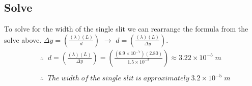 \documentclass{article}
\begin{document}
\subsection*{Solve}
To solve for the width of the single slit we can rearrange the formula from the solve above. $\Delta y = \left(\frac{(\lambda)(L)}{d}\right)$ $\to$ $d = \left(\frac{(\lambda)(L)}{\Delta y}\right)$.\\
\begin{align*}
     & \therefore\;\;d = \left(\frac{(\lambda)(L)}{\Delta y}\right) = \left(\frac{(6.9 \times 10^{-7})(2.80)}{1.5 \times 10^{-2}}\right) \approx 3.22 \times 10^{-5}\;m \\\\
     & \therefore\;\;The\;width \;of\;the\;single\;slit\;is\;approximately\;3.2 \times 10^{-5}\;m
\end{align*}\leavevmode\\
\end{document}
